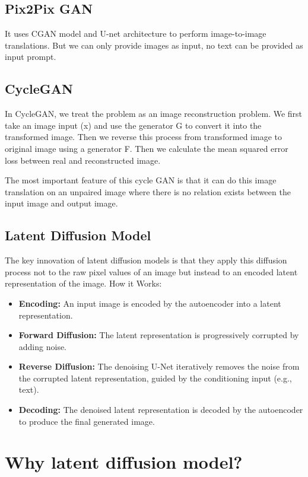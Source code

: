 \subsection{Pix2Pix GAN}
It uses CGAN model and U-net architecture to perform image-to-image translations. But we can only provide images as input, no text can be provided as input prompt.

\subsection{CycleGAN}
In CycleGAN, we treat the problem as an image reconstruction problem. We first take an image input (x) and use the generator G to convert it into the transformed image. Then we reverse this process from transformed image to original image using a generator F. Then we calculate the mean squared error loss between real and reconstructed image.\par
The most important feature of this cycle GAN is that it can do this image translation on an unpaired image where there is no relation exists between the input image and output image.

\subsection{Latent Diffusion Model}
The key innovation of latent diffusion models is that they apply this diffusion process not to the raw pixel values of an image but instead to an encoded latent representation of the image.
How it Works:
\begin{itemize}
    \item \textbf{Encoding:} An input image is encoded by the autoencoder into a latent representation. 
    \item \textbf{Forward Diffusion:} The latent representation is progressively corrupted by adding noise. 
    \item \textbf{Reverse Diffusion:} The denoising U-Net iteratively removes the noise from the corrupted latent representation, guided by the conditioning input (e.g., text). 
    \item \textbf{Decoding:} The denoised latent representation is decoded by the autoencoder to produce the final generated image.
\end{itemize}

\section{Why latent diffusion model?}

